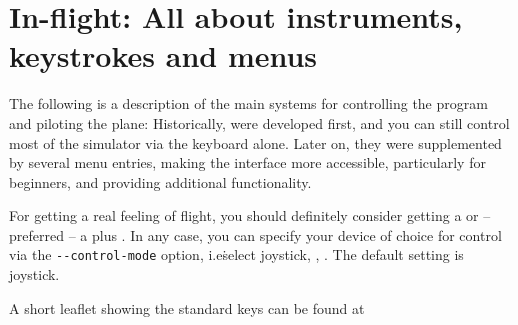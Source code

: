 \emph{}%

\chapter{In-flight: All about instruments, keystrokes and menus\label{flight}}

The following is a description of the main systems for controlling the
program and piloting the plane: Historically,  were
developed
first, and you can still control most of the simulator via the keyboard alone.
Later on,
they were supplemented by several menu entries, making the interface more
accessible,
particularly for beginners, and providing additional functionality. 

For getting a real feeling of flight, you should definitely consider
getting a  or -- preferred -- a  plus
. In any case, you can specify your device of
choice for control via the \texttt{-$ $-control-mode} option, i.e\.
select joystick, , . The default setting
is joystick. 

A short leaflet showing the standard keys can be found at
 \medskip

